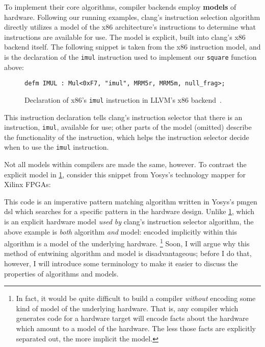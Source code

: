 To implement their core algorithms,
  compiler backends 
  employ \textbf{models} of hardware.
Following our running examples, 
  clang's instruction selection algorithm
  directly utilizes a model
  of the x86 architecture's
  instructions
  to determine what instructions
  are available for use.
The model is explicit,
  built into clang's x86 backend itself.
The following snippet is
  taken from the x86 instruction model,
  and is the declaration
  of the \texttt{imul} instruction
  used to implement our \texttt{square}
  function above:
  
\vspace{4mm}
\begin{figure}[H]
    \centering
\begin{verbatim}
defm IMUL : Mul<0xF7, "imul", MRM5r, MRM5m, null_frag>;
\end{verbatim}
\caption{
Declaration of x86's
  \texttt{imul}
  instruction in LLVM's x86 
  backend~\cite{llvmx86tablegen}.
}
    \label{fig:intro:llvm-tablegen}
\end{figure}
\noindent
This instruction declaration
  tells clang's instruction selector
  that there is an instruction,
  \texttt{imul},
  available for use;
  other parts of the model (omitted)
  describe the functionality of the instruction,
  which helps the instruction selector
  decide when to use the \texttt{imul} instruction.

Not all models within compilers
  are made the same, however.
To contrast the explicit model in
  \cref{fig:intro:llvm-tablegen},
  consider this snippet from Yosys's technology mapper
  for Xilinx FPGAs:

\vspace{4mm}


\noindent
This code is an imperative pattern matching
  algorithm
  written in Yosys's pmgen \gls{dsl}
  which searches for a specific pattern 
  in the hardware design.
Unlike \cref{fig:intro:llvm-tablegen},
  which is an explicit hardware model
  \textit{used by} clang's instruction selector algorithm,
  the above example is \textit{both} algorithm
  \textit{and} model:
  encoded implicitly
  within this algorithm
  is a model of the underlying hardware.%
\footnote{In fact, it would be quite difficult
  to build a compiler
  \textit{without} encoding some kind 
  of model of the underlying hardware.
That is, any compiler which generates code
  for a hardware target
  will encode facts about the hardware
  which amount to a model of the hardware.
The less those facts are explicitly separated out,
  the more implicit the model.}
Soon, I will argue why this method
  of entwining algorithm
  and model
  is disadvantageous;
  before I do that, however,
  I will introduce some terminology
  to make it easier to discuss 
  the properties
  of algorithms and models.

